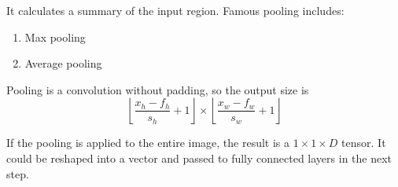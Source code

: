 It calculates a summary of the input region. Famous pooling includes:
\begin{enumerate}
    \item Max pooling
    \item Average pooling
\end{enumerate}

Pooling is a convolution without padding, so the output size is
\begin{equation}
    \left\lfloor \frac{x_h - f_h}{s_h} + 1 \right\rfloor \times \left\lfloor \frac{x_w - f_w}{s_w} + 1 \right\rfloor
\end{equation}

\begin{definition}
    If the pooling is applied to the entire image, the result is a $1 \times 1 \times D$ tensor. It could be reshaped into a vector and passed to fully connected layers in the next step.
\end{definition}



































